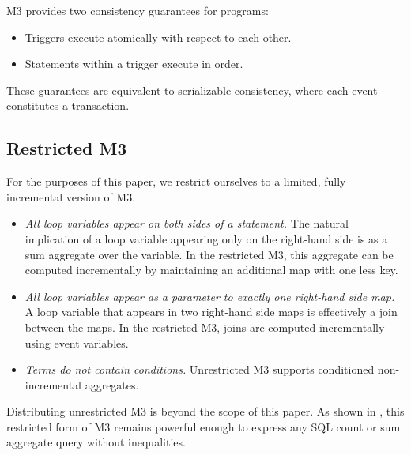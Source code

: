\documentclass{vldb}
\begin{document}
M3 provides two consistency guarantees for programs:
\begin{itemize}
\item Triggers execute atomically with respect to each other.
\item Statements within a trigger execute in order.
\end{itemize}
These guarantees are equivalent to serializable consistency, where each event constitutes a transaction.


\subsection{Restricted M3}

For the purposes of this paper, we restrict ourselves to a limited, fully incremental version of M3.  
\begin{itemize}
\item \textit{All loop variables appear on both sides of a statement.}  The natural implication of a loop variable appearing only on the right-hand side is as a sum aggregate over the variable.  In the restricted M3, this aggregate can be computed incrementally by maintaining an additional map with one less key.
\item \textit{All loop variables appear as a parameter to exactly one right-hand side map.}  A loop variable that appears in two right-hand side maps is effectively a join between the maps.  In the restricted M3, joins are computed incrementally using event variables.
\item \textit{Terms do not contain conditions.}  Unrestricted M3 supports conditioned non-incremental aggregates.
\end{itemize}

Distributing unrestricted M3 is beyond the scope of this paper.  As shown in \cite{dbtoaster-pods}, this restricted form of M3 remains powerful enough to express any SQL count or sum aggregate query without inequalities.  
\end{document}
